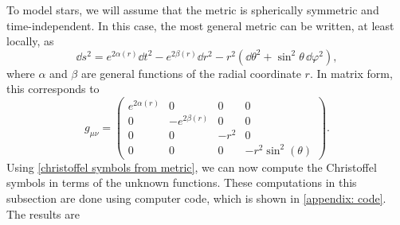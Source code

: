To model stars, we will assume that the metric is spherically symmetric and time-independent.
In this case, the most general metric can be written, at least locally, as~\autocite{carrollSpacetimeGeometryIntroduction2019}
%
\begin{equation}
    \dd s^2 
    = e^{2\alpha(r)} \dd t^2 - e^{2 \beta(r)} \dd r^2 - 
    r^2 (\dd \theta^2 + \sin^2 \theta \, \dd \varphi^2),
\end{equation}
%
where $\alpha$ and $\beta$ are general functions of the radial coordinate $r$.
In matrix form, this corresponds to 
%
\begin{equation}
    \label{spherically symmetric metric}
    g_{\mu \nu} =
    \left(
        \begin{matrix}
            e^{2 \alpha{\left(r \right)}} & 0 & 0 & 0\\
            0 & - e^{2 \beta{\left(r \right)}} & 0 & 0
            \\0 & 0 & - r^{2} & 0
            \\0 & 0 & 0 & - r^{2} \sin^{2}{\left(\theta \right)}
        \end{matrix}
     \right).
\end{equation}
%
Using \autoref{christoffel symbols from metric}, we can now compute the Christoffel symbols in terms of the unknown functions.
These computations in this subsection are done using computer code, which is shown in \autoref{appendix: code}.
The results are
%
